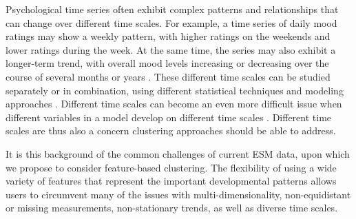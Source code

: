 \documentclass[man, 12pt, a4paper, mask, floatsintext]{apa7}
\theoremstyle{break}
\theoremstyle{plain}
\begin{document}
Psychological time series often exhibit complex patterns and relationships that can change over different time scales. For example, a time series of daily mood ratings may show a weekly pattern, with higher ratings on the weekends and lower ratings during the week. At the same time, the series may also exhibit a longer-term trend, with overall mood levels increasing or decreasing over the course of several months or years \citep[e.g.,][]{Ram2014}. These different time scales can be studied separately or in combination, using different statistical techniques and modeling approaches \citep[][]{bertenthal2007, jeronimus2019a}. Different time scales can become an even more difficult issue when different variables in a model develop on different time scales \citep{bringmann2022b}. Different time scales are thus also a concern clustering approaches should be able to address.

It is this background of the common challenges of current ESM data, upon which we propose to consider feature-based clustering. The flexibility of using a wide variety of features that represent the important developmental patterns allows users to circumvent many of the issues with multi-dimensionality, non-equidistant or missing measurements, non-stationary trends, as well as diverse time scales.

\end{document}
